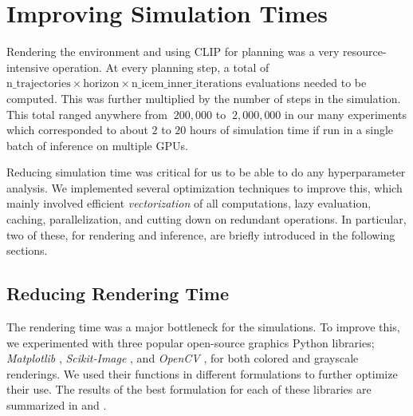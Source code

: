 \chapter{Improving Simulation Times}
\label{sec:efficiency}
Rendering the environment and using CLIP for planning was a very resource-intensive operation.
At every planning step, a total of \(\text{n\_trajectories} \times \text{horizon} \times \text{n\_icem\_inner\_iterations}\) evaluations needed to be computed.
This was further multiplied by the number of steps in the simulation.
This total ranged anywhere from \(~200,000\) to \(~2,000,000\) in our many experiments which corresponded to about \(2\) to \(20\) hours of simulation time if run in a single batch of inference on multiple GPUs.

Reducing simulation time was critical for us to be able to do any hyperparameter analysis.
We implemented several optimization techniques to improve this, which mainly involved efficient \emph{vectorization} of all computations, lazy evaluation, caching, parallelization, and cutting down on redundant operations.
In particular, two of these, for rendering and inference, are briefly introduced in the following sections.

\section{Reducing Rendering Time}
\label{sec:improving-render}
The rendering time was a major bottleneck for the simulations.
To improve this, we experimented with three popular open-source graphics Python libraries; \emph{Matplotlib} \citep{matplotlib}, \emph{Scikit-Image} \citep{skimage}, and \emph{OpenCV} \citep{opencv}, for both colored and grayscale renderings.
We used their functions in different formulations to further optimize their use.
The results of the best formulation for each of these libraries are summarized in  and .\\


